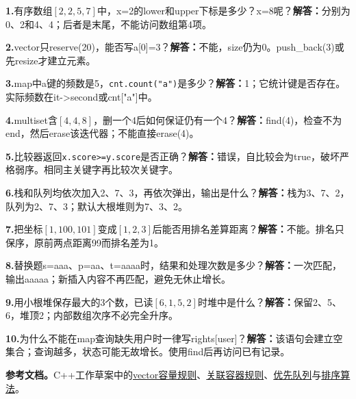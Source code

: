 \exercise
\textbf{1.}有序数组$[2,2,5,7]$中，x=2的lower和upper下标是多少？x=8呢？\textbf{解答：}分别为0、2和4、4；后者是末尾，不能访问数组第4项。

\textbf{2.}vector只reserve(20)，能否写a[0]=3？\textbf{解答：}不能，size仍为0。push\_back(3)或先resize才建立元素。

\textbf{3.}map中a键的频数是5，\texttt{cnt.count("a")}是多少？\textbf{解答：}1；它统计键是否存在。实际频数在it->second或cnt["a"]中。

\textbf{4.}multiset含$[4,4,8]$，删一个4后如何保证仍有一个4？\textbf{解答：}find(4)，检查不为end，然后erase该迭代器；不能直接erase(4)。

\textbf{5.}比较器返回\texttt{x.score>=y.score}是否正确？\textbf{解答：}错误，自比较会为true，破坏严格弱序。相同主关键字再比较次关键字。

\textbf{6.}栈和队列均依次加入2、7、3，再依次弹出，输出是什么？\textbf{解答：}栈为3、7、2，队列为2、7、3；默认大根堆则为7、3、2。

\textbf{7.}把坐标$[1,100,101]$变成$[1,2,3]$后能否用排名差算距离？\textbf{解答：}不能。排名只保序，原前两点距离99而排名差为1。

\textbf{8.}替换题s=aaa、p=aa、t=aaaa时，结果和处理次数是多少？\textbf{解答：}一次匹配，输出aaaaa；新插入内容不再匹配，避免无休止增长。

\textbf{9.}用小根堆保存最大的3个数，已读$[6,1,5,2]$时堆中是什么？\textbf{解答：}保留2、5、6，堆顶2；内部数组次序不必完全升序。

\textbf{10.}为什么不能在map查询缺失用户时一律写rights[user]？\textbf{解答：}该语句会建立空集合；查询越多，状态可能无故增长。使用find后再访问已有记录。

\textbf{参考文档。}C++工作草案中的\href{https://eel.is/c++draft/vector.capacity}{vector容量规则}、\href{https://eel.is/c++draft/associative.reqmts}{关联容器规则}、\href{https://eel.is/c++draft/priority.queue}{优先队列}与\href{https://eel.is/c++draft/alg.sorting}{排序算法}。
